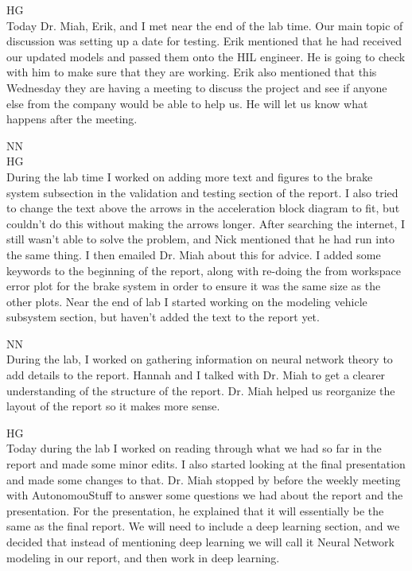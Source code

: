 \documentclass[fontsize=11pt, %
                             paper=letter, %
                             openany, %
                             captions=tableheading,
                             index=totoc,
                             hyperref]{labbook}
\def\currentYear{2021}
\begin{document}
\begin{addmargin}[0cm]{0cm}
HG\\
Today Dr. Miah, Erik, and I met near the end of the lab time. Our main topic of discussion was setting up a date for testing. Erik mentioned that he had received our updated models and passed them onto the HIL engineer. He is going to check with him to make sure that they are working. Erik also mentioned that this Wednesday they are having a meeting to discuss the project and see if anyone else from the company would be able to help us. He will let us know what happens after the meeting. 


\labday{Wednesday, March 9, \currentYear}
NN\\



HG\\
During the lab time I worked on adding more text and figures to the brake system subsection in the validation and testing section of the report. I also tried to change the text above the arrows in the acceleration block diagram to fit, but couldn't do this without making the arrows longer. After searching the internet, I still wasn't able to solve the problem, and Nick mentioned that he had run into the same thing. I then emailed Dr. Miah about this for advice. I added some keywords to the beginning of the report, along with re-doing the from workspace error plot for the brake system in order to ensure it was the same size as the other plots. Near the end of lab I started working on the modeling vehicle subsystem section, but haven't added the text to the report yet. 

\labday{Monday, March 21, \currentYear}
NN\\
During the lab, I worked on gathering information on neural network theory to add details to the report. Hannah and I talked with Dr. Miah to get a clearer understanding of the structure of the report. Dr. Miah helped us reorganize the layout of the report so it makes more sense.

HG\\
Today during the lab I worked on reading through what we had so far in the report and made some minor edits. I also started looking at the final presentation and made some changes to that. Dr. Miah stopped by before the weekly meeting with AutonomouStuff to answer some questions we had about the report and the presentation. For the presentation, he explained that it will essentially be the same as the final report. We will need to include a deep learning section, and we decided that instead of mentioning deep learning we will call it Neural Network modeling in our report, and then work in deep learning. 


\end{addmargin}
\end{document}

